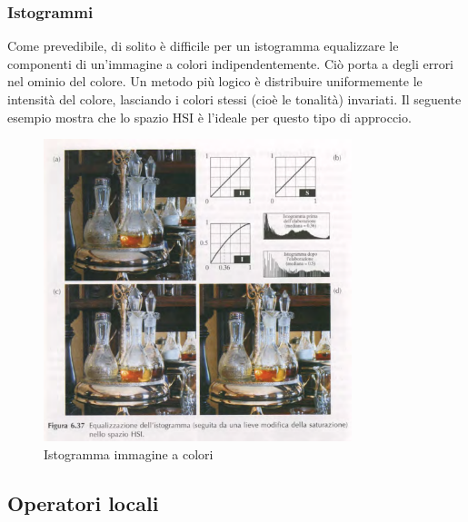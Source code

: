 \documentclass[12pt]{article}
\begin{document}
\subsubsection{Istogrammi}
Come prevedibile, di solito è difficile per un istogramma equalizzare le componenti di un'immagine a colori indipendentemente. Ciò porta a degli errori nel ominio del colore. Un metodo più logico è distribuire uniformemente le intensità del colore, lasciando i colori stessi (cioè le tonalità) invariati. Il seguente esempio mostra che lo spazio HSI è l'ideale per questo tipo di approccio.
\begin{figure}[!htb]
    \centering
    \includegraphics[width=0.8\textwidth]{Images/istcol.png}
    \caption{Istogramma immagine a colori}
\end{figure}
\FloatBarrier
\subsection{Operatori locali}
\end{document}
